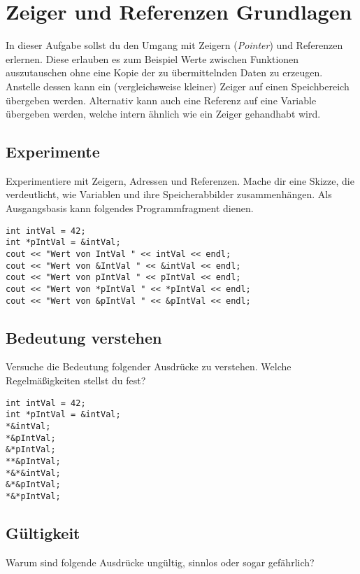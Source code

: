 \section{Zeiger und Referenzen Grundlagen}
In dieser Aufgabe sollst du den Umgang mit Zeigern (\emph{Pointer}) und Referenzen erlernen.
Diese erlauben es zum Beispiel Werte zwischen Funktionen auszutauschen ohne eine Kopie der zu übermittelnden Daten zu erzeugen.
Anstelle dessen kann ein (vergleichsweise kleiner) Zeiger auf einen Speichbereich übergeben werden.
Alternativ kann auch eine Referenz auf eine Variable übergeben werden, welche intern ähnlich wie ein Zeiger gehandhabt wird.

\subsection{Experimente}
Experimentiere mit Zeigern, Adressen und Referenzen.
Mache dir eine Skizze, die verdeutlicht, wie Variablen und ihre Speicherabbilder zusammenhängen.
Als Ausgangsbasis kann folgendes Programmfragment dienen.

\begin{lstlisting}
int intVal = 42;
int *pIntVal = &intVal;
cout << "Wert von IntVal " << intVal << endl;
cout << "Wert von &IntVal " << &intVal << endl;
cout << "Wert von pIntVal " << pIntVal << endl;
cout << "Wert von *pIntVal " << *pIntVal << endl;
cout << "Wert von &pIntVal " << &pIntVal << endl;
\end{lstlisting}

\subsection{Bedeutung verstehen}
Versuche die Bedeutung folgender Ausdrücke zu verstehen.
Welche Regelmäßigkeiten stellst du fest?

\begin{lstlisting}
int intVal = 42;
int *pIntVal = &intVal;
*&intVal;
*&pIntVal;
&*pIntVal;
**&pIntVal;
*&*&intVal;
&*&pIntVal;
*&*pIntVal;
\end{lstlisting}



\subsection{Gültigkeit}
Warum sind folgende Ausdrücke ungültig, sinnlos oder sogar gefährlich?

